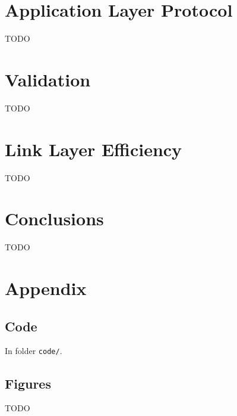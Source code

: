 \documentclass[11pt,a4paper]{article}
\begin{document}
\section{Application Layer Protocol}

TODO

\section{Validation}

TODO

\section{Link Layer Efficiency}

TODO

\section{Conclusions}

TODO

\pagebreak
\appendix
\section{Appendix}

\subsection{Code}

\noindent In folder \lstinline{code/}.

\subsection{Figures}

TODO
\end{document}
